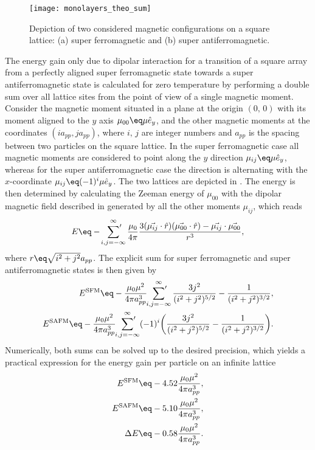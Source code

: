 \documentclass[\main/dresen_thesis.tex]{subfiles}
\begin{document}
  \begin{figure}[tb]
    \centering
    \texttt{[image: monolayers\_theo\_sum]}
    \caption{\label{fig:monolayers:magnetism:theoSum}Depiction of two considered magnetic configurations on a square lattice: (a) super ferromagnetic and (b) super antiferromagnetic.}
  \end{figure}


  The energy gain only due to dipolar interaction for a transition of a square array from a perfectly aligned super ferromagnetic state towards a super antiferromagnetic state is calculated for zero temperature by performing a double sum over all lattice sites from the point of view of a single magnetic moment.
  Consider the magnetic moment situated in a plane at the origin $(0, \,0)$ with its moment aligned to the $y$ axis $\mu_{00} \eq \mu \hat{e}_y$, and the other magnetic moments at the coordinates $(i a_{pp}, j a_{pp})$, where $i,\, j$ are integer numbers and $a_{pp}$ is the spacing between two particles on the square lattice.
  In the super ferromagnetic case all magnetic moments are considered to point along the $y$ direction $\mu_{ij} \eq \mu \hat{e}_y$, whereas for the super antiferromagnetic case the direction is alternating with the $x$-coordinate $\mu_{ij} \eq (-1)^i \mu \hat{e}_y$.
  The two lattices are depicted in .
  The energy is then determined by calculating the Zeeman energy of $\mu_{00}$ with the dipolar magnetic field described in  generated by all the other moments $\mu_{ij}$, which reads
  \begin{align}
    E \eq -\sideset{}{'}\sum_{i,j=-\infty}^\infty \frac{\mu_0}{4 \pi} \frac{3(\vec{\mu_{ij}} \cdot \hat{r})(\vec{\mu_{00}} \cdot \hat{r}) - \vec{\mu_{ij}} \cdot \vec{\mu_{00}} }{r^3},
  \end{align}
  where $r \eq \sqrt{i^2 + j^2} a_{pp}$.
  The explicit sum for super ferromagnetic and super antiferromagnetic states is then given by
  \begin{align}
    E^\mathrm{SFM} \eq -\frac{\mu_0 \mu^2}{4 \pi a^3_{pp}} \sideset{}{'}\sum_{i,j=-\infty}^\infty  \frac{3j^2}{(i^2 + j^2)^{5/2}} - \frac{1}{(i^2 + j^2)^{3/2}} ,\\
    E^\mathrm{SAFM} \eq -\frac{\mu_0 \mu^2}{4 \pi a^3_{pp}} \sideset{}{'}\sum_{i,j=-\infty}^\infty (-1)^i \biggl( \frac{3j^2}{(i^2 + j^2)^{5/2}} - \frac{1}{(i^2 + j^2)^{3/2}} \biggr).
  \end{align}
  Numerically, both sums can be solved up to the desired precision, which yields a practical expression for the energy gain per particle on an infinite lattice
  \begin{align}
    E^\mathrm{SFM} &\eq -4.52 \frac{\mu_0 \mu^2}{4 \pi a^3_{pp}},\\
    E^\mathrm{SAFM} &\eq -5.10 \frac{\mu_0 \mu^2}{4 \pi a^3_{pp}},\\
    \Delta E &\eq -0.58 \frac{\mu_0 \mu^2}{4 \pi a^3_{pp}}.
  \end{align}
\end{document}
